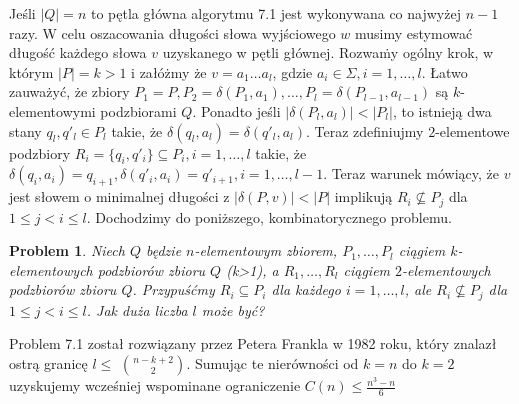 \documentclass[12pt,a4paper]{article}
\newtheorem{pro}{Problem}[section]
\begin{document}
 
Je\'sli $|Q|=n$ to p\k{e}tla g{\l}\'owna algorytmu 7.1 jest wykonywana co najwy\.zej $n-1$ razy. W celu oszacowania d{\l}ugo\'sci s{\l}owa wyj\'sciowego $w$ musimy estymowa\'c d{\l}ugo\'s\'c ka\.zdego s{\l}owa $v$ uzyskanego w  p\k{e}tli g{\l}\'ownej. 
Rozwa\.my og\'olny krok, w kt\'orym $|P|=k>1$ i za{\l}\'o\.zmy \.ze $v=a_{1}\ldots a_{l}$, gdzie $a_{i}\in \Sigma, i=1,\ldots, l$. {\L}atwo zauwa\.zy\'c, \.ze zbiory $P_{1}=P, P_{2}=\delta(P_{1},a_{1}),\ldots, P_{l}=\delta(P_{l-1},a_{l-1})$ s\k{a} $k$-elementowymi podzbiorami $Q$. Ponadto je\'sli $|\delta(P_{l},a_{l})|<|P_{l}|$, to istniej\k{a} dwa stany $q_{l},q'_{l}\in P_{l}$ takie, \.ze $\delta(q_{l},a_{l})=\delta(q'_{l},a_{l})$. Teraz zdefiniujmy  $2$-elementowe podzbiory $R_{i}=\{q_{i},q'_{i}\}\subseteq P_{i}, i=1,\ldots,l$ takie, \.ze $\delta(q_{i},a_{i})=q_{i+1}, \delta(q'_{i},a_{i})=q'_{i+1}, i=1,\ldots,l-1$. Teraz warunek m\'owi\k{a}cy, \.ze $v$ jest s{\l}owem o minimalnej d{\l}ugo\'sci z $|\delta(P,v)|<|P|$ implikuj\k{a} $R_{i}\not\subseteq P_{j}$ dla $1\leq j<i\leq l$. Dochodzimy do poni\.zszego, kombinatorycznego problemu.

\begin{pro}
Niech $Q$ b\k{e}dzie $n$-elementowym zbiorem, $P_{1},\ldots,P_{l}$ ci\k{a}giem $k$-elementowych podzbior\'ow zbioru $Q$ (k>1), a $R_{1},\ldots,R_{l}$ ci\k{a}giem $2$-elementowych podzbiorów zbioru $Q$. Przypu\'s\'cmy $R_{i}\subseteq P_{i}$ dla ka\.zdego $i=1,\ldots,l$, ale $R_{i}\not\subseteq P_{j}$ dla $1\leq j<i\leq l$. Jak du\.za liczba $l$ mo\.ze by\'c?
\end{pro}

Problem 7.1 zosta{\l} rozwi\k{a}zany przez Petera Frankla w 1982 roku, kt\'ory znalaz{\l} ostr\k{a} granic\k{e} $l\leq$ ${n-k+2}\choose{2}$. Sumuj\k{a}c te nier\'owno\'sci od $k=n$ do $k=2$ uzyskujemy wcze\'sniej wspominane ograniczenie $C(n)\leq\frac{n^{3}-n}{6}$
\end{document}
